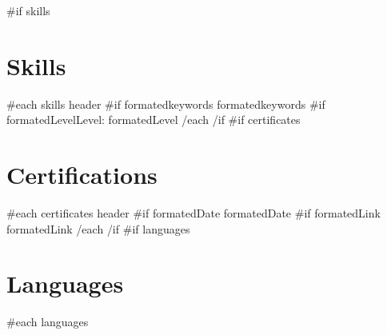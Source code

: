 \documentclass{article}
\begin{document}
\color{primary-950}
\fontsize{11pt}{13pt}\selectfont

\begin{paracol}{2}
\begin{leftcolumn*}
\titleformat{\section}{\color{accent}\raggedright\normalsize\bfseries\uppercase}{}{0ex}{}
\titlespacing{\section}{0ex}{0.35ex}{0.75ex}
{{#if skills}}\section*{Skills}{
  {{#each skills}}
    {{ header }}\newline
    {{#if formatedkeywords}}{{ formatedkeywords }}
    {{#if formatedLevel}}Level: {{ formatedLevel }}
  {{/each}}
}{{/if}}
{{#if certificates}}\section*{Certifications}{
  {{#each certificates}}
    {{ header }}\newline
    {{#if formatedDate}}{{ formatedDate }}
    {{#if formatedLink}}{{ formatedLink }}
  {{/each}}
}{{/if}}
{{#if languages}}\section*{Languages}{
  {{#each languages}}
}
\end{leftcolumn*}
\end{paracol}
\end{document}
